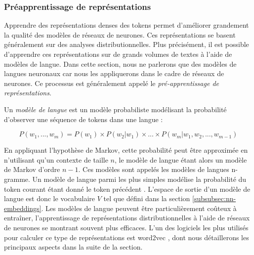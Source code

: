 \documentclass[12pt,a4paper,times,twoside,openright]{report}
\begin{document}
        
            \subsubsection{Préapprentissage de représentations}
            \label{subsubsec:word2vec}
Apprendre des représentations denses des tokens permet d'améliorer grandement la qualité des modèles de réseaux de neurones. Ces représentations se basent généralement sur des analyses distributionnelles. Plus précisément, il est possible d'apprendre ces représentations sur de grands volumes de textes à l'aide de modèles de langue. Dans cette section, nous ne parlerons que des modèles de langues neuronaux car nous les appliquerons dans le cadre de réseaux de neurones. Ce processus est généralement appelé le \emph{pré-apprentissage de représentations}.

Un \emph{modèle de langue} est un modèle probabiliste modélisant la probabilité d'observer une séquence de tokens dans une langue :

\begin{equation}\label{eq:language-model}
P(w_{1},...,w_{m}) = P(w_{1}) \times P(w_{2}|w_{1}) \times ... \times P(w_{m} | w_{1}, w_{2}, ..., w_{m-1})
\end{equation}

En appliquant l'hypothèse de Markov, cette probabilité peut être approximée en n'utilisant qu'un contexte de taille $n$, le modèle de langue étant alors un modèle de Markov d'ordre $n-1$. Ces modèles sont appelés les modèles de langues n-gramme. Un modèle de langue parmi les plus simples modélise la probabilité du token courant étant donné le token précédent \citep{bengio2003neural}. L'espace de sortie d'un modèle de langue est donc le vocabulaire $V$ tel que défini dans la section \ref{subsubsec:nn-embeddings}. Les modèles de langue peuvent être particulièrement coûteux à entraîner, l'apprentissage de représentations distributionnelles à l'aide de réseaux de neurones se montrant souvent plus efficaces. L'un des logiciels les plus utilisés pour calculer ce type de représentations est word2vec \citep{mikolov2013efficient,mikolov2013distributed}, dont nous détaillerons les principaux aspects dans la suite de la section.
\end{document}
